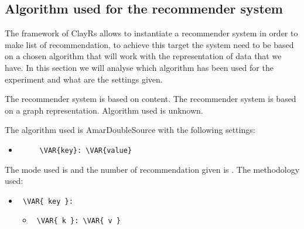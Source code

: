 \subsection{Algorithm used for the recommender system}\label{subsec:algo}
The framework of ClayRs allows to instantiate a recommender system in order to make list of recommendation, to achieve
this target the system need to be based on a chosen algorithm that will work with the representation of data that
we have.
In this section we will analyse which algorithm has been used for the experiment and what are the settings
given.
\hfill\break
\hfill\break

The recommender system is based on content.
\hfill\break
\hfill\break
{}
The recommender system is based on a graph representation.
\hfill\break
\hfill\break
{}
Algorithm used is unknown.
\hfill\break
\hfill\break
{}

The algorithm used is AmarDoubleSource with the following settings:
\begin{itemize}
    \item \begin{verbatim}
     \VAR{key}: \VAR{value}
\end{verbatim}
\end{itemize}
\hfill\break
\hfill\break
The mode used is  and the number of recommendation given is
.
The methodology used:
\begin{itemize}
    \item
     \verb| \VAR{ key }:|
     \begin{itemize}
       \item
            \verb| \VAR{ k }: \VAR{ v } |
     \end{itemize}
\end{itemize}
\hfill\break
\hfill\break


